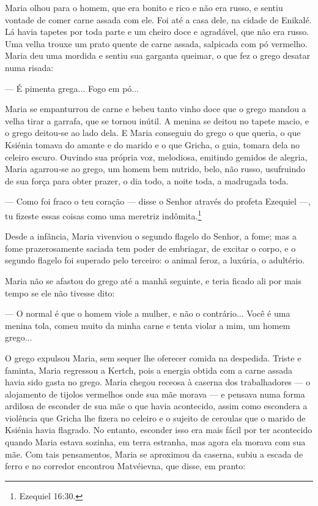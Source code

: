 Maria olhou para o homem, que era bonito e rico e não era russo, e
sentiu vontade de comer carne assada com ele. Foi até a casa dele, na
cidade de Enikalé. Lá havia tapetes por toda parte e um cheiro doce e
agradável, que não era russo. Uma velha trouxe um prato quente de carne
assada, salpicada com pó vermelho. Maria deu uma mordida e sentiu sua
garganta queimar, o que fez o grego desatar numa risada:

--- É pimenta grega... Fogo em pó...

Maria se empanturrou de carne e bebeu tanto vinho doce que o grego
mandou a velha tirar a garrafa, que se tornou inútil. A menina se deitou
no tapete macio, e o grego deitou-se ao lado dela. E Maria conseguiu do
grego o que queria, o que Ksiénia tomava do amante e do marido e o que
Gricha, o guia, tomara dela no celeiro escuro. Ouvindo sua própria voz,
melodiosa, emitindo gemidos de alegria, Maria agarrou-se ao grego, um
homem bem nutrido, belo, não russo, usufruindo de sua força para obter
prazer, o dia todo, a noite toda, a madrugada toda.

--- Como foi fraco o teu coração --- disse o Senhor através do profeta
Ezequiel ---, tu fizeste essas coisas como uma meretriz
indômita.\footnote{Ezequiel 16:30.}

Desde a infância, Maria vivenviou o segundo flagelo do Senhor, a fome;
mas a fome prazerosamente saciada tem poder de embriagar, de excitar o
corpo, e o segundo flagelo foi superado pelo terceiro: o animal feroz, a
luxúria, o adultério.

Maria não se afastou do grego até a manhã seguinte, e teria ficado ali
por mais tempo se ele não tivesse dito:

--- O normal é que o homem viole a mulher, e não o contrário... Você é
uma menina tola, comeu muito da minha carne e tenta violar a mim, um
homem grego...

O grego expulsou Maria, sem sequer lhe oferecer comida na despedida.
Triste e faminta, Maria regressou a Kertch, pois a energia obtida com a
carne assada havia sido gasta no grego. Maria chegou receosa à caserna
dos trabalhadores --- o alojamento de tijolos vermelhos onde sua mãe
morava --- e pensava numa forma ardilosa de esconder de sua mãe o que
havia acontecido, assim como escondera a violência que Gricha lhe fizera
no celeiro e o sujeito de ceroulas que o marido de Ksiénia havia
flagrado. No entanto, esconder isso era mais fácil por ter acontecido
quando Maria estava sozinha, em terra estranha, mas agora ela morava com
sua mãe. Com tais pensamentos, Maria se aproximou da caserna, subiu a
escada de ferro e no corredor encontrou Matvéievna, que disse, em
pranto:


